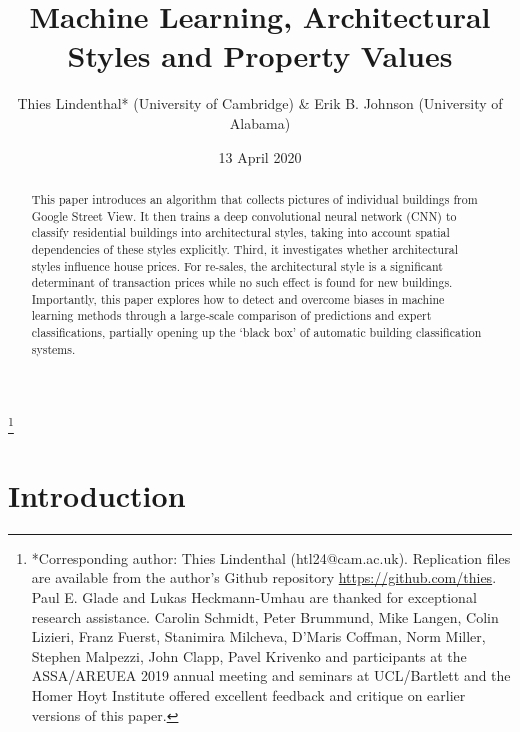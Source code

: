 \documentclass[]{article}
\title{Machine Learning, Architectural Styles and Property Values}
\author{Thies Lindenthal* (University of Cambridge) \& Erik B. Johnson
(University of Alabama)}
\date{13 April 2020}
\let\rmarkdownfootnote\footnote%
\def\footnote{\protect\rmarkdownfootnote}
\begin{document}
\maketitle
\begin{abstract}
This paper introduces an algorithm that collects pictures of individual
buildings from Google Street View. It then trains a deep convolutional
neural network (CNN) to classify residential buildings into
architectural styles, taking into account spatial dependencies of these
styles explicitly. Third, it investigates whether architectural styles
influence house prices. For re-sales, the architectural style is a
significant determinant of transaction prices while no such effect is
found for new buildings. Importantly, this paper explores how to detect
and overcome biases in machine learning methods through a large-scale
comparison of predictions and expert classifications, partially opening
up the `black box' of automatic building classification systems.
\end{abstract}

\let\svthefootnote\thefootnote
\let\thefootnote\relax

\footnote{{*Corresponding author: Thies Lindenthal (htl24@cam.ac.uk). Replication files are available from the author's Github repository \href{https://github.com/thies}{https://github.com/thies}. Paul E. Glade and Lukas Heckmann-Umhau are thanked for exceptional research assistance. Carolin Schmidt, Peter Brummund, Mike Langen, Colin Lizieri, Franz Fuerst, Stanimira Milcheva, D'Maris Coffman, Norm Miller, Stephen Malpezzi, John Clapp, Pavel Krivenko and participants at the ASSA/AREUEA 2019 annual meeting and seminars at UCL/Bartlett and the Homer Hoyt Institute offered excellent feedback and critique on earlier versions of this paper.}}

\addtocounter{footnote}{-1}\let\thefootnote\svthefootnote

\newpage

\hypertarget{introduction}{%
\section{Introduction}\label{introduction}}
\end{document}
